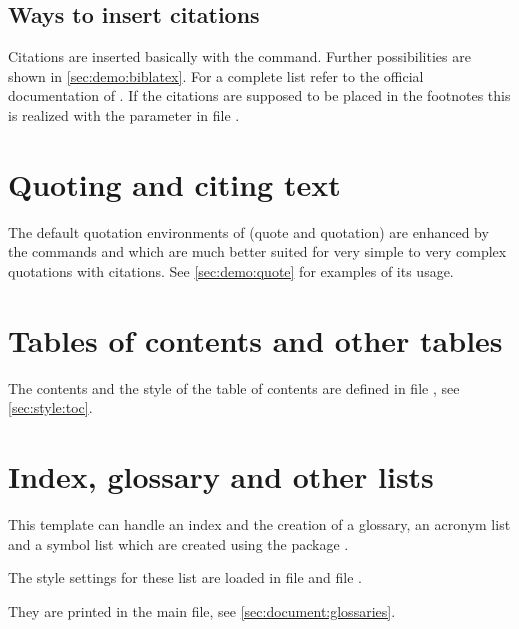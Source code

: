\subsection{Ways to insert citations}

Citations are inserted basically with the  command. Further possibilities are shown in \cref{sec:demo:biblatex}. For a complete list refer to the official documentation of . If the citations are supposed to be placed in the footnotes this is realized with the parameter  in file 
.

\section{Quoting and citing text}
\label{sec:doc:faq:quotes}
The default quotation environments of \latex (quote and quotation) are enhanced by the commands  and  which are much better suited for very simple to very complex quotations with citations.
See \cref{sec:demo:quote} for examples of its usage.

\section{Tables of contents and other tables}
\label{sec:doc:faq:toc}

The contents and the style of the table of contents are defined in file , see \cref{sec:style:toc}.

\section{Index, glossary and other lists}
\label{sec:doc:faq:index}

This template can handle an index and the creation of a glossary, an acronym list and a symbol list which are created using the package .

The style settings for these list are loaded in file  and file .

They are printed in the main file, see \cref{sec:document:glossaries}.

